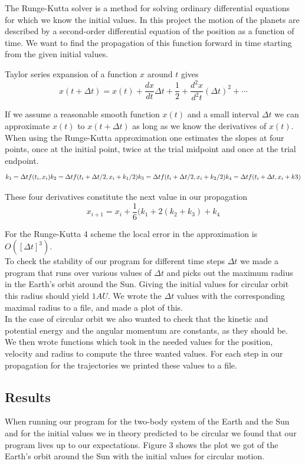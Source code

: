 \documentclass[a4paper,12pt, english]{article}
\begin{document}
The Runge-Kutta solver is a method for solving ordinary differential equations for which we know the initial values. In this project the motion of the planets are described by a second-order differential equation of the position as a function of time. We want to find the propagation of this function forward in time starting from the given initial values. 

Taylor series expansion of a function $x$ around $t$ gives
$$ x(t+ \Delta t) = x(t) + \frac{dx}{dt} \Delta t + \frac{1}{2} + \frac{d^2 x}{d^2 t} (\Delta t)^2 + \cdots $$

If we assume a reasonable smooth function $x(t)$ and a small interval $\Delta t$ we can approximate $x(t)$ to $x(t + \Delta t)$ as long as we know the derivatives of $x(t)$. 
When using the Runge-Kutta approximation one estimates the slopes at four points, once at the initial point, twice at the trial midpoint and once at the trial endpoint. 
$$ k_1 = \Delta t f(t_i,x_i) \\
k_2 = \Delta t f(t_i + \Delta t /2, x_i + k_1/2) \\
k_3 = \Delta t f(t_i + \Delta t/2, x_i + k_2/2) \\
k_4 = \Delta t f(t_i + \Delta t, x_i + k3) $$

These four derivatives constitute the next value in our propagation
$$x_{i+1} = x_i + \frac{1}{6} (k_1 + 2(k_2+k_3) + k_4$$ 

For the Runge-Kutta 4 scheme the local error in the approximation is $O([\Delta t]^3)$. \\

To check the stability of our program for different time steps $\Delta t$ we made a program that runs over various values of $\Delta t$ and picks out the maximum radius in the Earth's orbit around the Sun. Giving the initial values for circular orbit this radius should yield $1 AU$. We wrote the $\Delta t$ values with the corresponding maximal radius to a file, and made a plot of this. \\

In the case of circular orbit we also wanted to check that the kinetic and potential energy and the angular momentum are constants, as they should be. We then wrote functions which took in the needed values for the position, velocity and radius to compute the three wanted values. For each step in our propagation for the trajectories we printed these values to a file.  


\subsection*{Results}
When running our program for the two-body system of the Earth and the Sun and for the initial values we in theory predicted to be circular we found that our program lives up to our expectations. Figure 3 shows the plot we got of the Earth's orbit around the Sun with the initial values for circular motion.
\end{document}
